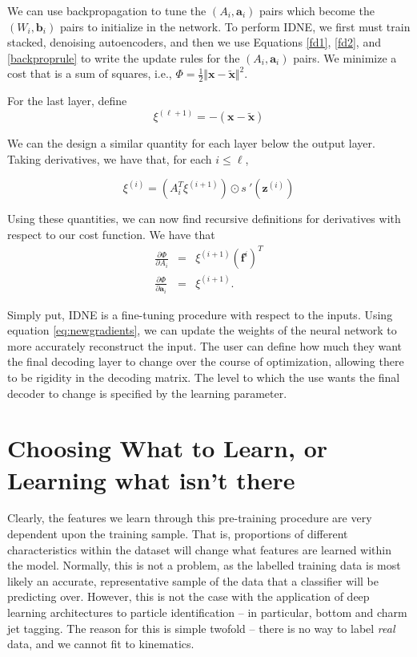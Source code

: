 We can use backpropagation to tune the $(A_i, \mathbf{a}_i)$ pairs which become the $(W_i, \mathbf{b}_i)$ pairs to initialize in the network. To perform IDNE, we first must train stacked, denoising autoencoders, and then we use Equations \eqref{fd1}, \eqref{fd2}, and \eqref{backproprule} to write the update rules for the $(A_i, \mathbf{a}_i)$ pairs. We minimize a cost that is a sum of squares, i.e., $\Phi = \frac{1}{2}\Vert \mathbf{x} - \tilde{\mathbf{x}} \Vert ^2 $.

For the last layer, define
\begin{equation}
\label{eq:finallayer}
\xi^{(\ell+1)} = -(\mathbf{x} - \tilde{\mathbf{x}})
\end{equation}

We can the design a similar quantity for each layer below the output layer. Taking derivatives, we have that, for each $i\leq \ell$,

\begin{equation}
\label{update1}
\xi^{(i)} = (A_i^T\xi^{(i+1)})\odot s\:'(\mathbf{z}^{(i)})
\end{equation}

Using these quantities, we can now find recursive definitions for derivatives with respect to our cost function. We have that 
\begin{eqnarray}
\label{eq:newgradients}
\frac{\partial\Phi}{\partial A_i} &=& \xi^{(i+1)}(\mathbf{f}^{i})^T\\
\frac{\partial\Phi}{\partial \mathbf{a}_i} &=& \xi^{(i+1)}.
\end{eqnarray}


Simply put, IDNE is a fine-tuning procedure with respect to the inputs. Using equation \eqref{eq:newgradients}, we can update the weights of the neural network to more accurately reconstruct the input. The user can define how much they want the final decoding layer to change over the course of optimization, allowing there to be rigidity in the decoding matrix. The level to which the use wants the final decoder to change is specified by the learning parameter. 


\section{Choosing What to Learn, or Learning what isn't there}

Clearly, the features we learn through this pre-training procedure are very dependent upon the training sample. That is, proportions of different characteristics within the dataset will change what features are learned within the model. Normally, this is not a problem, as the labelled training data is most likely an accurate, representative sample of the data that a classifier will be predicting over. However, this is not the case with the application of deep learning architectures to particle identification -- in particular, bottom and charm jet tagging. The reason for this is simple twofold -- there is no way to label \emph{real} data, and we cannot fit to kinematics. 

